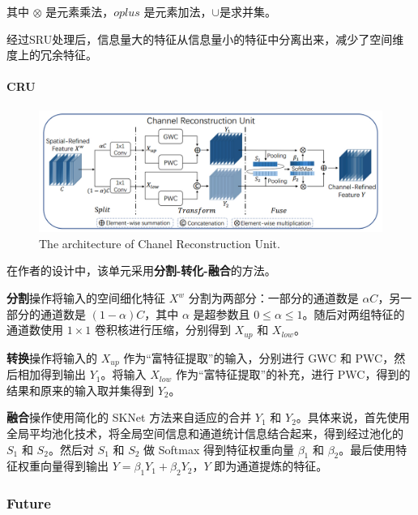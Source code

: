 \documentclass[a4paper, 10pt]{article}
\begin{document}
		其中 $\otimes$ 是元素乘法，$oplus$ 是元素加法，$\cup$是求并集。
		
		经过SRU处理后，信息量大的特征从信息量小的特征中分离出来，减少了空间维度上的冗余特征。
		
		\paragraph{CRU}
		
		\begin{figure}[htbp]
			\centering 
			\includegraphics[width=\columnwidth]{picture/LLIE/SCConv/Chanel Reconstruction Unit}
			\caption{
				\label{fig: Chanel Reconstruction Unit} 
				The architecture of Chanel Reconstruction Unit.
			}
		\end{figure}
		
		在作者的设计中，该单元采用\textbf{分割-转化-融合}的方法。
		
		\textbf{分割}操作将输入的空间细化特征 $X^{w}$ 分割为两部分：一部分的通道数是 $\alpha C$，另一部分的通道数是 $\left(1-\alpha \right) C$，其中 $\alpha$ 是超参数且 $0 \leq \alpha \leq 1$。随后对两组特征的通道数使用 $1 \times 1$ 卷积核进行压缩，分别得到 $X_{up}$ 和 $X_{low}$。
		
		\textbf{转换}操作将输入的 $X_{up}$ 作为“富特征提取”的输入，分别进行 GWC 和 PWC，然后相加得到输出 $Y_{1}$。将输入 $X_{low}$ 作为“富特征提取”的补充，进行 PWC，得到的结果和原来的输入取并集得到 $Y_2$。
		
		\textbf{融合}操作使用简化的 SKNet 方法来自适应的合并 $Y_{1}$ 和 $Y_{2}$。具体来说，首先使用全局平均池化技术，将全局空间信息和通道统计信息结合起来，得到经过池化的 $S_{1}$ 和 $S_{2}$。然后对 $S_{1}$ 和 $S_{2}$ 做 Softmax 得到特征权重向量 $\beta_{1}$ 和 $\beta_{2}$。最后使用特征权重向量得到输出 $Y=\beta_{1}Y_{1} + \beta_{2}Y_{2}$，$Y$ 即为通道提炼的特征。
		
		\subsubsection{Future}
		
\end{document}
